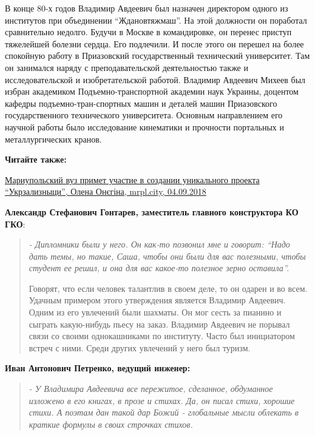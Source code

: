 В конце 80-х годов Владимир Авдеевич был назначен директором одного из
институтов при объединении \enquote{Ждановтяжмаш}. На этой должности он поработал
сравнительно недолго. Будучи в Москве в командировке, он перенес приступ
тяжелейшей болезни сердца. Его подлечили. И после этого он перешел на более
спокойную работу в Приазовский государственный технический университет. Там он
занимался наряду с преподавательской деятельностью также и исследовательской и
изобретательской работой. Владимир Авдеевич Михеев был избран академиком
Подъемно-транспортной академии наук Украины, доцентом кафедры
подъемно-тран\hyp{}спортных машин и деталей машин Приазовского государственного
технического университета. Основным направлением его научной работы было
исследование кинематики и прочности портальных и металлургических кранов.

\textbf{Читайте также:} 

\href{https://mrpl.city/news/view/mariupolskij-vuz-primet-uchastie-v-sozdanii-unikalnogo-proekta-quotukrzaliznytsi-quot}{%
Мариупольский вуз примет участие в создании уникального проекта \enquote{Укрзализныци}, Олена Онєгіна, mrpl.city, 04.09.2018}

\textbf{Александр Стефанович Гонтарев, заместитель главного конструктора КО ГКО}:

\begin{quote}
\em	
- Дипломники были у него. Он как-то позвонил мне и говорит: \enquote{Надо дать темы, но
такие, Саша, чтобы они были для вас полезными, чтобы студент ее решил, и она
для вас какое-то полезное зерно оставила}.

Говорят, что если человек талантлив в своем деле, то он одарен и во всем.
Удачным примером этого утверждения является Владимир Авдеевич. Одним из его
увлечений были шахматы. Он мог сесть за пианино и сыграть какую-нибудь пьесу на
заказ. Владимир Авдеевич не порывал связи со своими однокашниками по институту.
Часто был инициатором встреч с ними. Среди других увлечений у него был туризм.
\end{quote}

\textbf{Иван Антонович Петренко, ведущий инженер:} 

\begin{quote}
\em - У Владимира Авдеевича все пережитое, сделанное, обдуманное изложено в его
книгах, в прозе и стихах. Да, он писал стихи, хорошие стихи. А поэтам дан такой
дар Божий - глобальные мысли облекать в краткие формулы в своих строчках
стихов.	
\end{quote}

